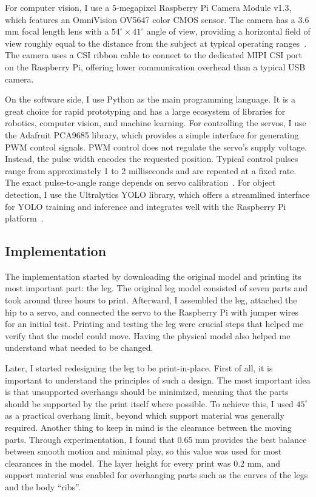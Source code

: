 \documentclass[a4paper,12pt]{report}
\begin{document}
For computer vision, I use a 5-megapixel Raspberry Pi Camera Module v1.3, which features
an OmniVision OV5647 color CMOS sensor. The camera has a 3.6 mm focal length lens with a
$54^\circ \times 41^\circ$
angle of view, providing a horizontal field of view roughly equal to the distance from the subject
at typical operating ranges~\parencite{cameraV1}. The camera uses a CSI ribbon cable to connect to
the dedicated MIPI CSI port on the Raspberry Pi, offering lower communication overhead than a
typical USB camera.

On the software side, I use Python as the main programming language. It is a great choice for rapid
prototyping and has a large ecosystem of libraries for robotics, computer vision, and machine
learning. For controlling the servos, I use the Adafruit PCA9685 library, which provides a simple
interface for generating PWM control signals. PWM control does not regulate the servo's supply
voltage. Instead, the pulse width encodes the requested position. Typical control pulses range from
approximately 1 to 2 milliseconds and are repeated at a fixed rate. The exact pulse-to-angle range
depends on servo calibration~\parencite{adafruitpca9685,mg996r}. For object detection, I use the
Ultralytics YOLO library, which offers a streamlined interface for YOLO training and inference and
integrates well with the Raspberry Pi platform~\parencite{ultralytics}.
\subsection{Implementation}
\label{subsec:implementation}
The implementation started by downloading the original model and printing its most important part:
the leg. The original leg model consisted of seven parts and took around three hours to print.
Afterward, I assembled the leg, attached the hip to a servo, and connected the servo to the
Raspberry Pi with jumper wires for an initial test. Printing and testing the leg were crucial steps
that helped me verify that the model could move. Having the physical model also helped me understand
what needed to be changed.

Later, I started redesigning the leg to be print-in-place. First of all, it is important to
understand the principles of such a design. The most important idea is that unsupported overhangs
should be minimized, meaning that the parts should be supported by the print itself where possible.
To achieve this, I used $45^\circ$ as a practical overhang limit, beyond which support material was
generally required. Another thing to keep in mind is the clearance between the moving parts.
Through experimentation, I found that 0.65 mm provides the best balance between smooth motion and
minimal play, so this value was used for most clearances in the model. The layer height for every
print was 0.2 mm, and support material was enabled for overhanging parts such as the curves of the
legs and the body ``ribs''.
\end{document}
